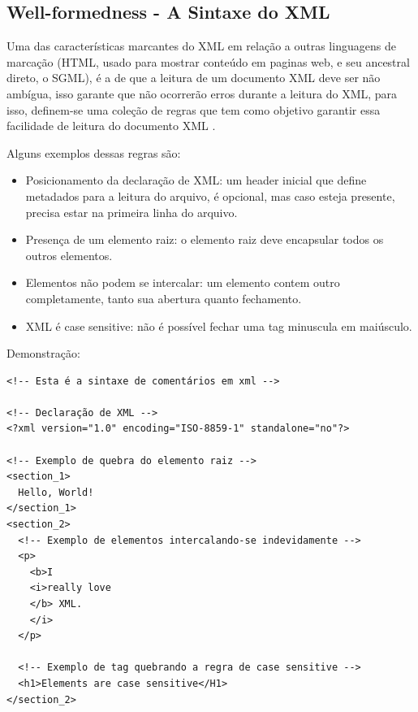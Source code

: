 \subsection{Well-formedness - A Sintaxe do XML}

Uma das características marcantes do XML em relação a outras linguagens de marcação (HTML, usado para mostrar conteúdo em paginas web, e seu ancestral direto, o SGML), é a de que a leitura de um documento XML deve ser não ambígua, isso garante que não ocorrerão erros durante a leitura do XML, para isso, definem-se uma coleção de regras que tem como objetivo garantir essa facilidade de leitura do documento XML \cite{computerphile}.

\bigskip

Alguns exemplos dessas regras são:
\begin{itemize}
  \item Posicionamento da declaração de XML: um header inicial que define metadados para a leitura do arquivo, é opcional, mas caso esteja presente, precisa estar na primeira linha do arquivo.
  \item Presença de um elemento raiz: o elemento raiz deve encapsular todos os outros elementos.
  \item Elementos não podem se intercalar: um elemento contem outro completamente, tanto sua abertura quanto fechamento.
  \item XML é case sensitive: não é possível fechar uma tag minuscula em maiúsculo.
\end{itemize}

\newline
\smallskip

Demonstração:

\begin{verbatim}
<!-- Esta é a sintaxe de comentários em xml -->

<!-- Declaração de XML -->
<?xml version="1.0" encoding="ISO-8859-1" standalone="no"?>

<!-- Exemplo de quebra do elemento raiz -->
<section_1>
  Hello, World!
</section_1>
<section_2>
  <!-- Exemplo de elementos intercalando-se indevidamente -->
  <p>
    <b>I 
    <i>really love
    </b> XML.
    </i>
  </p>
  
  <!-- Exemplo de tag quebrando a regra de case sensitive -->
  <h1>Elements are case sensitive</H1>
</section_2>
\end{verbatim}


